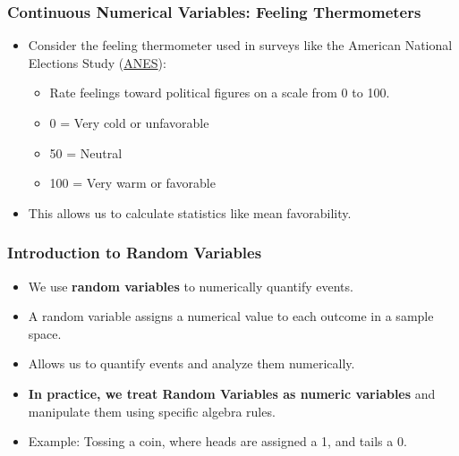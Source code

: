 \documentclass[handout]{beamer} %
\begin{document}
\begin{frame}
    \frametitle{Continuous Numerical Variables: Feeling Thermometers}
    \begin{itemize}
        \item Consider the feeling thermometer used in surveys like the American National Elections Study (\href{https://electionstudies.org/}{ANES}): \pause
        \begin{itemize}
            \item Rate feelings toward political figures on a scale from 0 to 100. \pause
            \item 0 = Very cold or unfavorable \pause
            \item 50 = Neutral \pause
            \item 100 = Very warm or favorable \pause
        \end{itemize}
        \item This allows us to calculate statistics like mean favorability.
    \end{itemize}
\end{frame}

\begin{frame}
    \frametitle{Introduction to Random Variables}
    \begin{itemize}
        \item We use \textbf{random variables} to numerically quantify events. \pause
        \item A random variable assigns a numerical value to each outcome in a sample space. \pause

     \pause

        \item Allows us to quantify events and analyze them numerically. \pause
        \item \textbf{In practice, we treat Random Variables as numeric variables} and manipulate them using specific algebra rules.
        \item Example: Tossing a coin, where heads are assigned a 1, and tails a 0. \pause
    \end{itemize}



\end{frame}
\end{document}
